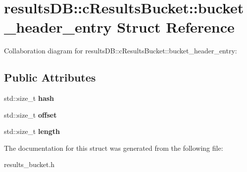 \hypertarget{structresultsDB_1_1cResultsBucket_1_1bucket__header__entry}{\section{results\-D\-B\-:\-:c\-Results\-Bucket\-:\-:bucket\-\_\-header\-\_\-entry Struct Reference}
\label{structresultsDB_1_1cResultsBucket_1_1bucket__header__entry}
}


Collaboration diagram for results\-D\-B\-:\-:c\-Results\-Bucket\-:\-:bucket\-\_\-header\-\_\-entry\-:
\subsection*{Public Attributes}
\begin{DoxyCompactItemize}
\item 
\hypertarget{structresultsDB_1_1cResultsBucket_1_1bucket__header__entry_a48df72fc3d9c61a12e34a6f54c52c91b}{std\-::size\-\_\-t {\bfseries hash}}\label{structresultsDB_1_1cResultsBucket_1_1bucket__header__entry_a48df72fc3d9c61a12e34a6f54c52c91b}

\item 
\hypertarget{structresultsDB_1_1cResultsBucket_1_1bucket__header__entry_a431f966e0ae4999cbebda38f49abcb23}{std\-::size\-\_\-t {\bfseries offset}}\label{structresultsDB_1_1cResultsBucket_1_1bucket__header__entry_a431f966e0ae4999cbebda38f49abcb23}

\item 
\hypertarget{structresultsDB_1_1cResultsBucket_1_1bucket__header__entry_aa353295a8dd03e63f4b9b67c856ff235}{std\-::size\-\_\-t {\bfseries length}}\label{structresultsDB_1_1cResultsBucket_1_1bucket__header__entry_aa353295a8dd03e63f4b9b67c856ff235}

\end{DoxyCompactItemize}


The documentation for this struct was generated from the following file\-:\begin{DoxyCompactItemize}
\item 
results\-\_\-bucket.\-h\end{DoxyCompactItemize}
